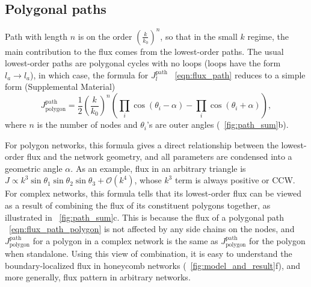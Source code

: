 \documentclass[
 preprint,
 preprintnumbers,
 amsmath,amssymb,
 aps,
 pre,
 longbibliography,
 superscriptaddress,
 10pt, twocolumn
]{revtex4-1}
\begin{document}
\subsection{Polygonal paths}
Path with length $n$ is on the order $(\frac{k}{k_0})^n$, so that in the small $k$ regime, the main contribution to the flux comes from the lowest-order paths.
The usual lowest-order paths are polygonal cycles with no loops (loops have the form $l_a\rightarrow l_a$), in which case, the formula for $J^\text{path}_l$ \eqnname~\eqref{eqn:flux_path} reduces to a simple form (Supplemental Material)
\begin{equation} \label{eqn:flux_path_polygon}
    J^\text{path}_\text{polygon} = \frac{1}{2} (\frac{k}{k_0})^n (\prod_i \cos(\theta_i - \alpha) - \prod_i \cos(\theta_i + \alpha)),
\end{equation}
where $n$ is the number of nodes and $\theta_i$'s are outer angles (\figurename~\ref{fig:path_sum}b).

For polygon networks, this formula gives a direct relationship between the lowest-order flux and the network geometry, and all parameters are condensed into a geometric angle $\alpha$. As an example, flux in an arbitrary triangle is $J \propto k^3 \sin\theta_1\sin\theta_2\sin\theta_3 + \mathcal{O}(k^4)$, whose $k^3$ term is always positive or CCW.
For complex networks, this formula tells that its lowest-order flux can be viewed as a result of combining the flux of its constituent polygons together, as illustrated in \figurename~\ref{fig:path_sum}c. This is because the flux of a polygonal path \eqnname~\eqref{eqn:flux_path_polygon} is not affected by any side chains on the nodes, and $J^\text{path}_\text{polygon}$ for a polygon in a complex network is the same as $J^\text{path}_\text{polygon}$ for the polygon when standalone. Using this view of combination, it is easy to understand the boundary-localized flux in honeycomb networks (\figurename~\ref{fig:model_and_result}f), and more generally, flux pattern in arbitrary networks.

\end{document}
